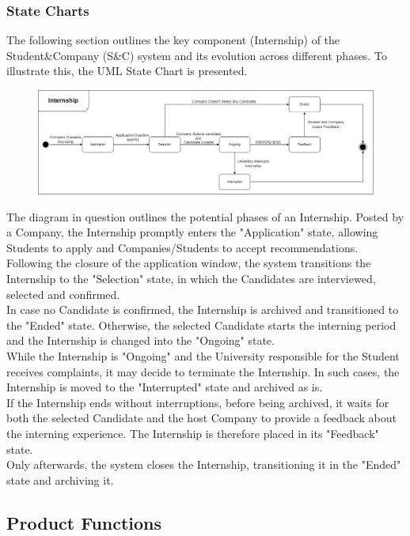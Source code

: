 \documentclass{article}
\begin{document}
\subsubsection{State Charts}
The following section outlines the key component (Internship) of the Student\&Company (S\&C) system and its evolution across different phases. To illustrate this, the UML State Chart is presented.
\begin{figure}[H]
    \centering
    \includegraphics[scale = 0.30]{figures/StateCharts.drawio.png}
    \centering
\end{figure}
The diagram in question outlines the potential phases of an Internship. Posted by a Company, the Internship promptly enters the "Application" state, allowing Students to apply and Companies/Students to accept recommendations. 
\\Following the closure of the application window, the system transitions the Internship to the "Selection" state, in which the Candidates are interviewed, selected and confirmed. 
\\In case no Candidate is confirmed, the Internship is archived and transitioned to the "Ended" state. Otherwise, the selected Candidate starts the interning period and the Internship is changed into the "Ongoing" state. 
\\While the Internship is "Ongoing" and the University responsible for the Student receives complaints, it may decide to terminate the Internship. In such cases, the Internship is moved to the "Interrupted" state and archived as is.
\\If the Internship ends without interruptions, before being archived, it waits for both the selected Candidate and the host Company to provide a feedback about the interning experience. The Internship is therefore placed in its "Feedback" state.
\\Only afterwards, the system closes the Internship, transitioning it in the "Ended" state and archiving it.


\subsection{Product Functions}
\end{document}
